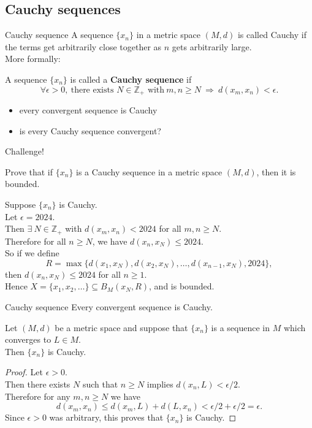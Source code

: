 \documentclass{beamer}
\begin{document}
\subsection{Cauchy sequences}

\begin{frame}{Cauchy sequence}
A sequence $\{x_n\}$ in a metric space $(M,d)$ is called Cauchy if the terms get arbitrarily close together as $n$ gets arbitrarily large.\\
\pause
More formally:
\pause
\begin{defn}
A sequence $\{x_n\}$ is called a \textbf{Cauchy sequence} if
$$\forall \epsilon > 0,\ \text{there exists $N\in\mathbb Z_{+}$ with}\ m,n\geq N\ \Rightarrow\ d(x_m,x_n) < \epsilon.$$
\end{defn}
\begin{itemize}
\pause
\item every convergent sequence is Cauchy
\pause
\item is every Cauchy sequence convergent?
\end{itemize}
\end{frame}

\begin{frame}{Challenge!}
\begin{prob}
Prove that if $\{x_n\}$ is a Cauchy sequence in a metric space $(M,d)$, then it is bounded.
\end{prob}
\pause
\begin{soln}
\pause
Suppose $\{x_n\}$ is Cauchy.\\
\pause
Let $\epsilon = 2024$.\\
\pause
Then $\exists\ N\in\mathbb{Z}_+$ with $d(x_m,x_n) < 2024$ for all $m,n\geq N$.\\
\pause
Therefore for all $n\geq N$, we have $d(x_n,x_N)\leq 2024$.\\
\pause
So if we define
$$R = \max\{d(x_1,x_N), d(x_2,x_N),\dots, d(x_{n-1},x_N),2024\},$$
\pause
then $d(x_n,x_N)\leq 2024$ for all $n\geq 1$.\\
\pause
Hence $X = \{x_1,x_2,\dots\}\subseteq B_M(x_N,R)$, and is bounded.
\end{soln}
\end{frame}

\begin{frame}{Cauchy sequence}
Every convergent sequence is Cauchy.
\pause
\begin{thm}
Let $(M,d)$ be a metric space and suppose that $\{x_n\}$ is a sequence in $M$ which converges to $L\in M$.\\
Then $\{x_n\}$ is Cauchy.
\end{thm}
\pause
\begin{proof}
\pause
Let $\epsilon > 0$.\\
\pause
Then there exists $N$ such that $n\geq N$ implies $d(x_n,L) < \epsilon/2$.\\
\pause
Therefore for any $m,n\geq N$ we have
$$d(x_m,x_n)\leq d(x_m,L) + d(L,x_n) < \epsilon/2 + \epsilon/2 = \epsilon.$$
Since $\epsilon > 0$ was arbitrary, this proves that $\{x_n\}$ is Cauchy.
\end{proof}
\end{frame}
\end{document}
